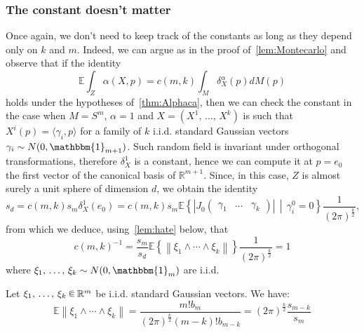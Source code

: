 \documentclass[AHL, Unicode, longabstracts, published]{cedram}
\newcommand{\R}{\mathbb{R}}
\newcommand{\EE}{\mathbb{E}}
\newcommand{\bbun}{\mathbbm{1}}
\renewcommand{\a}{\alpha}
\newcommand{\uball}{b}
\newcommand*\randin{
\mathchoice {\raisebox{-.35ex}{$\displaystyle{^\subset}$}\mkern-11.5mu\raisebox{+.45ex}{$\displaystyle{_\subset}$}} {\mkern+1mu\raisebox{-.27ex}{$\textstyle{^\subset}$}\mkern-11.7mu\raisebox{+.45ex}{$\textstyle{_\subset}$}} {\raisebox{.35ex}{$\scriptstyle\subset$}\mkern-14mu\raisebox{-.15ex}{$\scriptstyle\subset$}} {\raisebox{.3ex}{$\scriptscriptstyle\subset$}\mkern-13.5mu\raisebox{-.10ex}{$\scriptscriptstyle\subset$}}}
\begin{document}
\subsubsection{The constant doesn't matter}

Once again, we don't need to keep track of the constants as long as they depend only on $k$ and $m$. Indeed, we can argue as in the proof of~\cref{lem:Montecarlo} and observe that if the identity
\begin{equation}\label{eq:alphacmk}
\EE \int_Z \a(X,p)=c(m,k)\int_M\delta^\a_X(p)dM(p)
\end{equation}
holds under the hypotheses of~\cref{thm:Alphaca}, then we can check the constant in the case when $M=S^m$, $\a=1$ and $X=(X^1,\,\dots,\,X^k)$ is such that $X^i(p)=\langle \gamma_i,p\rangle$ for a family of $k$ i.i.d. standard Gaussian vectors $\gamma_i\sim N(0,\bbun_{m+1})$. Such random field is invariant under orthogonal transformations, therefore $\delta_X^1$ is a constant, hence we can compute it at $p=e_0$ the first vector of the canonical basis of $\R^{m+1}$. Since, in this case, $Z$ is almost surely a unit sphere of dimension $d$, we obtain the identity
\begin{equation*}
s_d=c(m,k)s_m\delta_X^1(e_0)=c(m,k)s_m\EE\left\{\left|J_0
\begin{pmatrix}
\gamma_1 & \dots & \gamma_k
\end{pmatrix}\right|\,\middle|\, \gamma_i^0=0\right\}\frac{1}{(2\pi)^{\frac k2}},
\end{equation*}
from which we deduce, using~\cref{lem:hate} below, that
\begin{equation*}
c(m,k)^{-1}=\frac{s_m}{s_d}\EE\left\{\left\|\xi_1\wedge\cdots\wedge\xi_k\right\|\right\}\frac{1}{(2\pi)^{\frac k2}}=1
\end{equation*}
where $\xi_1,\,\ldots,\,\xi_k\sim N(0,\bbun_m)$ are i.i.d.

\begin{lemm}\label{lem:hate}
Let $\xi_1,\,\ldots,\,\xi_k\,\randin\,\R^m$ be i.i.d. standard Gaussian vectors. We have:
\begin{equation*}
\EE\left\|\xi_1\wedge\cdots\wedge\xi_k\right\|=\frac{m!\uball_m}{(2\pi)^{\frac{k}{2}}(m-k)!\uball_{m-k}}=(2\pi)^{\frac k2}\frac{s_{m-k}}{s_m}
\end{equation*}
\end{lemm}
\end{document}
